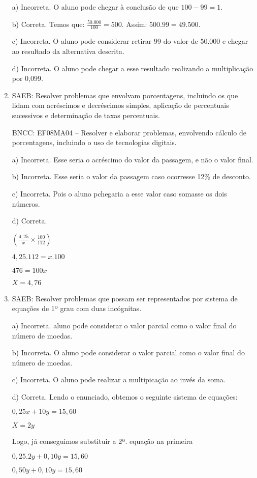 \begin{enumerate}
a) Incorreta. O aluno pode chegar à conclusão de que $100 - 99 = 1$.

b) Correta. Temos que: $\frac{50.000}{100} = 500$. Assim: $500 . 99 = 49.500$.

c) Incorreta. O aluno pode considerar retirar 99 do valor de 50.000
e chegar ao resultado da alternativa descrita.

d) Incorreta. O aluno pode chegar a esse resultado realizando a
multiplicação por 0,099.

\item SAEB: Resolver problemas que envolvam porcentagens, incluindo os que
lidam com acréscimos e decréscimos simples, aplicação de percentuais
sucessivos e determinação de taxas percentuais.

BNCC: EF08MA04 -- Resolver e elaborar problemas, envolvendo cálculo de
porcentagens, incluindo o uso de tecnologias digitais.

a) Incorreta. Esse seria o acréscimo do valor da passagem, e não o
valor final.

b) Incorreta. Esse seria o valor da passagem caso ocorresse 12\% de
desconto.

c) Incorreta. Pois o aluno pchegaria a esse valor caso somasse os dois
números.

d) Correta.

$(\frac{4,25}{x} \times \frac{100}{112})$

$4,25 . 112 = x . 100$

$476= 100x$

$X = 4,76$
\item 
SAEB: Resolver problemas que possam ser representados por sistema de
equações de 1º grau com duas incógnitas.

a) Incorreta. aluno pode considerar o valor parcial como o valor
final do número de moedas.

b) Incorreta. O aluno pode considerar o valor parcial como o valor final do
número de moedas.

c) Incorreta. O aluno pode realizar a multipicação ao invés da soma.

d) Correta. Lendo o enunciado, obtemos o seguinte sistema de
equações:

$0,25x + 10y = 15,60$

$X = 2y$

Logo, já conseguimos substituir a 2ª. equação na primeira

$0,25 . 2y + 0,10y = 15,60$

$0,50y + 0,10y = 15,60$


\end{enumerate}
